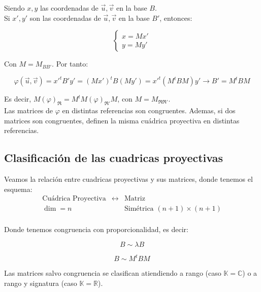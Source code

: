 Siendo $x,y$ las coordenadas de $\vec{u}, \vec{v}$ en la base $B$.\\
Si $x', y'$ son las coordenadas de $\vec{u}, \vec{v}$ en la base $B'$, entonces:

\[
    \begin{cases}
        x = M x' \\
        y = M y'
    \end{cases}
\]

Con $M = M_{BB'}$. Por tanto:

\[
    \hat{\varphi}(\vec{u}, \vec{v}) =
    x'^t B' y' =
    (M x')^t B (M y') =
    x'^t (M^t B M) y' \longrightarrow
    B' = M^t B M
\]

Es decir, $M(\varphi)_{\mathfrak{R}} = M^t M(\varphi)_{\mathfrak{R}'} M$, con $M = M_{\mathfrak{R} \mathfrak{R}'}$.\\

Las matrices de $\varphi$ en distintas referencias son congruentes. Ademas, si dos matrices son congruentes, definen la misma cuádrica proyectiva en distintas referencias.

\subsection{Clasificación de las cuadricas proyectivas}

Veamos la relación entre cuadricas proyectivas y sus matrices, donde tenemos el esquema:
\[
    \begin{array}{ccc}
        \text{Cuádrica Proyectiva} & \longleftrightarrow & \text{Matriz} \\
        \dim = n & & \text{Simétrica } (n+1) \times (n+1) \\
    \end{array}
\]

Donde tenemos congruencia con proporcionalidad, es decir:

\[
B \sim \lambda B
\]

\[
B \sim M^t B M
\]

Las matrices salvo congruencia se clasifican atiendiendo a rango (caso $\mathbb{K} = \mathbb{C}$) o a rango y signatura (caso $\mathbb{K} = \mathbb{R}$).\\

